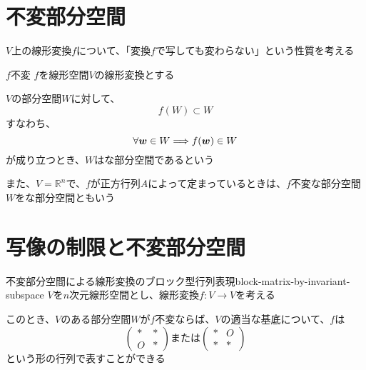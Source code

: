 \documentclass[../../../topic_linear-algebra]{subfiles}
\begin{document}
\sectionline
\section{不変部分空間}

$V$上の線形変換$f$について、「変換$f$で写しても変わらない」という性質を考える

\begin{definition}{$f$不変}
  $f$を線形空間$V$の線形変換とする

  $V$の部分空間$W$に対して、
  \begin{equation*}
    f(W) \subset W
  \end{equation*}
  すなわち、
  \begin{equation*}
    \forall\vb*{w} \in W \Longrightarrow f(\vb*{w}) \in W
  \end{equation*}
  が成り立つとき、$W$はな部分空間であるという

  \br

  また、$V=\mathbb{R}^n$で、$f$が正方行列$A$によって定まっているときは、$f$不変な部分空間$W$をな部分空間ともいう
\end{definition}

\sectionline
\section{写像の制限と不変部分空間}

\begin{theorem}{不変部分空間による線形変換のブロック型行列表現}{block-matrix-by-invariant-subspace}
  $V$を$n$次元線形空間とし、線形変換$f\colon V \to V$を考える

  このとき、$V$のある部分空間$W$が$f$不変ならば、$V$の適当な基底について、$f$は
  \begin{equation*}
    \begin{pmatrix}
      * & * \\
      O & *
    \end{pmatrix} \text{または}
    \begin{pmatrix}
      * & O \\
      * & *
    \end{pmatrix}
  \end{equation*}
  という形の行列で表すことができる
\end{theorem}
\end{document}
